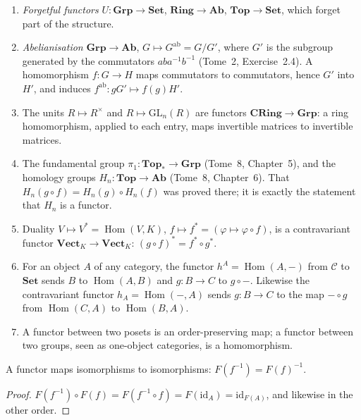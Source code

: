 \begin{example}\label{ex:functors}
\leavevmode
\begin{enumerate}[label=(\alph*)]
\item \emph{Forgetful functors} $U\colon\mathbf{Grp}\to\mathbf{Set}$, $\mathbf{Ring}\to\mathbf{Ab}$, $\mathbf{Top}\to\mathbf{Set}$, which forget part of the structure.
\item \emph{Abelianisation} $\mathbf{Grp}\to\mathbf{Ab}$, $G\mapsto G^{\mathrm{ab}}=G/G'$, where $G'$ is the subgroup generated by the commutators $aba^{-1}b^{-1}$ (Tome~2, Exercise~2.4). A homomorphism $f\colon G\to H$ maps commutators to commutators, hence $G'$ into $H'$, and induces $f^{\mathrm{ab}}\colon gG'\mapsto f(g)H'$.
\item The units $R\mapsto R^\times$ and $R\mapsto\mathrm{GL}_n(R)$ are functors $\mathbf{CRing}\to\mathbf{Grp}$: a ring homomorphism, applied to each entry, maps invertible matrices to invertible
matrices.
\item The fundamental group $\pi_1\colon\mathbf{Top}_*\to\mathbf{Grp}$ (Tome~8, Chapter~5), and the homology groups $H_n\colon\mathbf{Top}\to\mathbf{Ab}$ (Tome~8, Chapter~6). That $H_n(g\circ f)=H_n(g)\circ H_n(f)$
was proved there; it is exactly the statement that $H_n$ is a functor.
\item Duality $V\mapsto V^*=\operatorname{Hom}(V,K)$, $f\mapsto f^*=(\varphi\mapsto\varphi\circ f)$, is a contravariant functor $\mathbf{Vect}_K\to\mathbf{Vect}_K$: $(g\circ f)^*=f^*\circ g^*$.
\item For an object $A$ of any category, the functor $h^A=\operatorname{Hom}(A,-)$ from $\mathcal C$ to $\mathbf{Set}$ sends $B$ to $\operatorname{Hom}(A,B)$ and $g\colon B\to C$ to $g\circ-$. Likewise
the contravariant functor $h_A=\operatorname{Hom}(-,A)$ sends $g\colon B\to C$ to the map $-\circ g$ from $\operatorname{Hom}(C,A)$ to $\operatorname{Hom}(B,A)$.
\item A functor between two posets is an order-preserving map; a functor between two groups, seen as one-object categories, is a homomorphism.
\end{enumerate}
\end{example}

\begin{proposition}\label{prop:functoriso}
A functor maps isomorphisms to isomorphisms: $F(f^{-1})=F(f)^{-1}$.
\end{proposition}

\begin{proof}
$F(f^{-1})\circ F(f)=F(f^{-1}\circ f)=F(\mathrm{id}_A)=\mathrm{id}_{F(A)}$, and likewise in the other order.
\end{proof}

